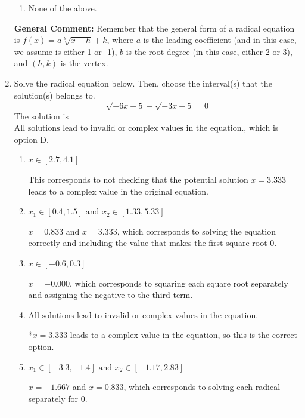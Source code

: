 \documentclass{extbook}[14pt]
\newcommand{\litem}[1]{\item #1

\rule{\textwidth}{0.4pt}}
\begin{document}
\begin{enumerate}
{\begin{enumerate}[label=\Alph*.]
\item None of the above.\end{enumerate}
\textbf{General Comment:} Remember that the general form of a radical equation is $ f(x) = a \sqrt[b]{x - h} + k $, where $a$ is the leading coefficient (and in this case, we assume is either 1 or -1), $b$ is the root degree (in this case, either 2 or 3), and $(h, k)$ is the vertex.
}
\litem{
Solve the radical equation below. Then, choose the interval(s) that the solution(s) belongs to.
\[ \sqrt{-6 x + 5} - \sqrt{-3 x - 5} = 0 \]The solution is \( \text{All solutions lead to invalid or complex values in the equation.} \), which is option D.\begin{enumerate}[label=\Alph*.]
\item \( x \in [2.7,4.1] \)

This corresponds to not checking that the potential solution $x = 3.333$ leads to a complex value in the original equation.
\item \( x_1 \in [0.4, 1.5] \text{ and } x_2 \in [1.33,5.33] \)

$x = 0.833$ and $x = 3.333$, which corresponds to solving the equation correctly and including the value that makes the first square root 0.
\item \( x \in [-0.6,0.3] \)

$x = -0.000$, which corresponds to squaring each square root separately and assigning the negative to the third term.
\item \( \text{All solutions lead to invalid or complex values in the equation.} \)

*$x = 3.333$ leads to a complex value in the equation, so this is the correct option.
\item \( x_1 \in [-3.3, -1.4] \text{ and } x_2 \in [-1.17,2.83] \)

$x = -1.667$ and $x = 0.833$, which corresponds to solving each radical separately for 0.
\end{enumerate}

}
\end{enumerate}
\end{document}
